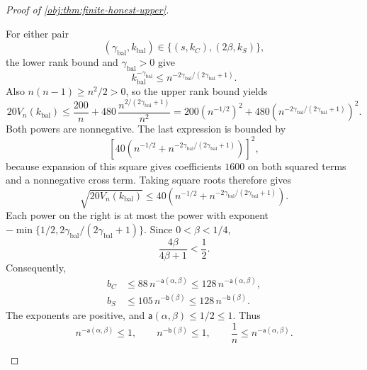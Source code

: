 \begin{proof}[Proof of \cref{obj:thm:finite-honest-upper}]
\begin{enumerate}
For either pair
\[
(\gamma_{\mathrm{bal}},k_{\mathrm{bal}})
\in\{(s,k_C),(2\beta,k_S)\},
\]
the lower rank bound and \(\gamma_{\mathrm{bal}}>0\) give
\[
k_{\mathrm{bal}}^{-\gamma_{\mathrm{bal}}}
\le
n^{-2\gamma_{\mathrm{bal}}/(2\gamma_{\mathrm{bal}}+1)}.
\]
Also \(n(n-1)\ge n^2/2>0\), so the upper rank bound yields
\[
20V_n(k_{\mathrm{bal}})
\le
\frac{200}{n}
+
480\,\frac{n^{2/(2\gamma_{\mathrm{bal}}+1)}}{n^2}
=
200(n^{-1/2})^2
+
480\left(
n^{-2\gamma_{\mathrm{bal}}/(2\gamma_{\mathrm{bal}}+1)}
\right)^2.
\]
Both powers are nonnegative. The last expression is bounded by
\[
\left[
40\left(
n^{-1/2}
+
n^{-2\gamma_{\mathrm{bal}}/(2\gamma_{\mathrm{bal}}+1)}
\right)
\right]^2,
\]
because expansion of this square gives coefficients \(1600\) on both squared terms and a nonnegative cross term. Taking square roots therefore gives
\[
\sqrt{20V_n(k_{\mathrm{bal}})}
\le
40\left(
n^{-1/2}
+
n^{-2\gamma_{\mathrm{bal}}/(2\gamma_{\mathrm{bal}}+1)}
\right).
\]
Each power on the right is at most the power with exponent
\(-\min\{1/2,2\gamma_{\mathrm{bal}}/(2\gamma_{\mathrm{bal}}+1)\}\).
Since \(0<\beta<1/4\),
\[
\frac{4\beta}{4\beta+1}<\frac12.
\]
Consequently,
\[
\begin{aligned}
b_C
&\le88\,n^{-\mathsf a(\alpha,\beta)}
\le128\,n^{-\mathsf a(\alpha,\beta)},\\
b_S
&\le105\,n^{-\mathsf b(\beta)}
\le128\,n^{-\mathsf b(\beta)}.
\end{aligned}
\]
The exponents are positive, and \(\mathsf a(\alpha,\beta)\le1/2\le1\). Thus
\[
n^{-\mathsf a(\alpha,\beta)}\le1,
\qquad
n^{-\mathsf b(\beta)}\le1,
\qquad
\frac1n\le n^{-\mathsf a(\alpha,\beta)}.
\]


\end{enumerate}
\end{proof}
